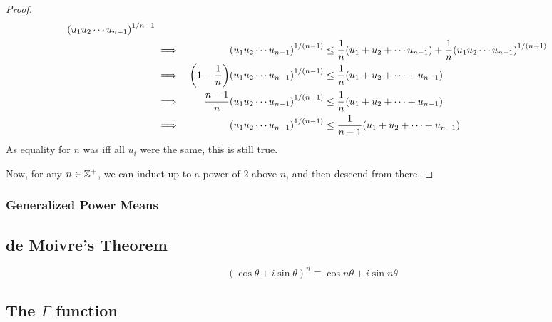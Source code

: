 \begin{proof}
\begin{alignat*}
{            \pqty{u_1 u_2 \dotsm u_{n - 1}}^{1/{n - 1}}} \\
&\implies& \pqty{u_1 u_2 \dotsm u_{n - 1}}^{1 / (n - 1)} &\le
         \frac 1n \pqty{u_1 + u_2 + \dotsb u_{n - 1}} +
         \frac 1n \pqty{u_1 u_2 \dotsm u_{n - 1}}^{1 / (n - 1)} \\
&\implies& \pqty{1 - \frac 1n}
         \pqty{u_1 u_2 \dotsm u_{n - 1}}^{1 / (n - 1)} &\le
         \frac 1n \pqty{u_1 + u_2 + \dotsb + u_{n - 1}} \\
&\implies& \frac {n - 1}n
         \pqty{u_1 u_2 \dotsb u_{n - 1}}^{1 / (n - 1)} &\le
         \frac 1n \pqty{u_1 + u_2 + \dotsb + u_{n - 1}} \\
&\implies& \pqty{u_1 u_2 \dotsm u_{n - 1}}^{1 / (n - 1)} &\le
         \frac 1{n - 1} \pqty{u_1 + u_2 + \dotsb + u_{n - 1}}
\end{alignat*}
As equality for \(n\) was iff all \(u_i\) were the same, this is still true.

Now, for any \(n \in \mathbb Z^+\), we can induct up to a power of 2 above
\(n\), and then descend from there.
\end{proof}

\subsubsection{Generalized Power Means}

\subsection{de Moivre's Theorem}

\begin{equation}
(\cos \theta + i \sin \theta)^n \equiv \cos n\theta + i \sin n\theta
\end{equation}

\subsection[The \texorpdfstring{\(\Gamma\)}{Gamma} function]
           {The \boldmath\(\Gamma\) function}

